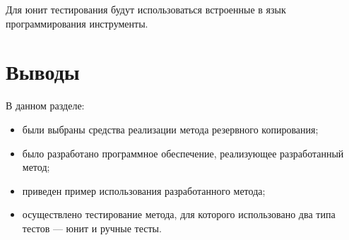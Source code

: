 Для юнит тестирования будут использоваться встроенные в язык программирования инструменты.  

\section{Выводы}

\begin{flushleft}
В данном разделе:
\end{flushleft}
\begin{itemize}[label=\textbullet]
\item были выбраны средства реализации метода резервного копирования;
\item было разработано программное обеспечение, реализующее разработанный метод;
\item приведен пример использования разработанного метода;
\item осуществлено тестирование метода, для которого использовано два типа тестов --- юнит и ручные тесты.
\end{itemize}




